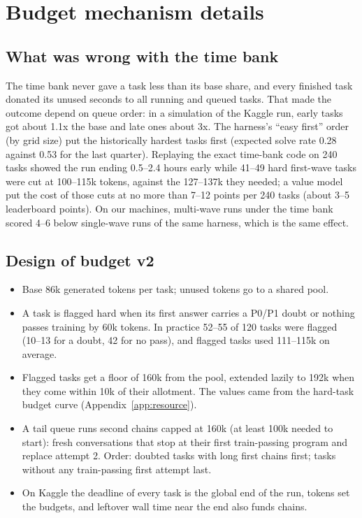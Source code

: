 \section{Budget mechanism details}\label{app:budget}

\subsection{What was wrong with the time bank}
The time bank never gave a task less than its base share, and every finished task donated its unused seconds to all running and queued tasks. That made the outcome depend on queue order: in a simulation of the Kaggle run, early tasks got about 1.1x the base and late ones about 3x. The harness's ``easy first'' order (by grid size) put the historically hardest tasks first (expected solve rate 0.28 against 0.53 for the last quarter). Replaying the exact time-bank code on 240 tasks showed the run ending 0.5--2.4 hours early while 41--49 hard first-wave tasks were cut at 100--115k tokens, against the 127--137k they needed; a value model put the cost of those cuts at no more than 7--12 points per 240 tasks (about 3--5 leaderboard points). On our machines, multi-wave runs under the time bank scored 4--6 below single-wave runs of the same harness, which is the same effect.

\subsection{Design of budget v2}
\begin{itemize}
\item Base 86k generated tokens per task; unused tokens go to a shared pool.
\item A task is flagged hard when its first answer carries a P0/P1 doubt or nothing passes training by 60k tokens. In practice 52--55 of 120 tasks were flagged (10--13 for a doubt, 42 for no pass), and flagged tasks used 111--115k on average.
\item Flagged tasks get a floor of 160k from the pool, extended lazily to 192k when they come within 10k of their allotment. The values came from the hard-task budget curve (Appendix~\ref{app:resource}).
\item A tail queue runs second chains capped at 160k (at least 100k needed to start): fresh conversations that stop at their first train-passing program and replace attempt 2. Order: doubted tasks with long first chains first; tasks without any train-passing first attempt last.
\item On Kaggle the deadline of every task is the global end of the run, tokens set the budgets, and leftover wall time near the end also funds chains.
\end{itemize}

